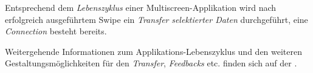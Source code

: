 {Entsprechend dem \textit{Lebenszyklus} einer Multiscreen-Applikation wird nach erfolgreich ausgeführtem Swipe ein \textit{Transfer} \textit{selektierter Daten} durchgeführt, eine \textit{Connection} besteht bereits.

Weitergehende Informationen zum Applikations-Lebenszyklus und den weiteren Gestaltungsmöglichkeiten für den \textit{Transfer}, \textit{Feedbacks} etc. finden sich auf der \developerpage.
}


\newcommand{\authors}{
Alexander Hahn, Hochschule Mannheim  \\
Valentina Burjan, Hochschule Mannheim \\
Dominick Madden, Hochschule Mannheim \\
Horst Schneider, Hochschule Mannheim}

\newcommand{\versionhistory}{10.08.2016}
\newcommand{\dateofcreation}{17.09.2015}
\newcommand{\comments}{---}
\newcommand{\questions}{---}



